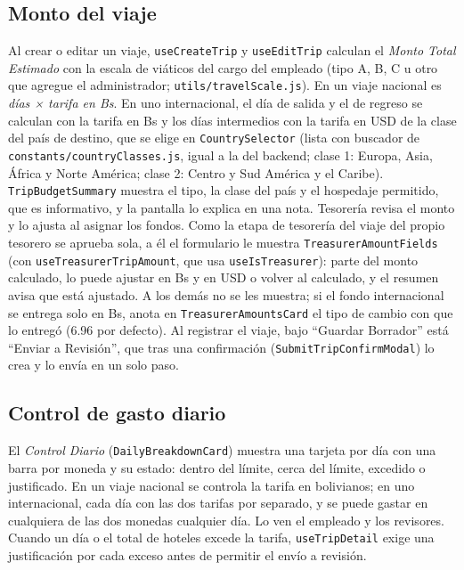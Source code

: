 \documentclass[11pt,letterpaper]{article}
\newcommand{\code}[1]{\nolinkurl{#1}}
\begin{document}
\subsection{Monto del viaje}
Al crear o editar un viaje, \code{useCreateTrip} y \code{useEditTrip} calculan el \emph{Monto Total Estimado} con la escala de viáticos del cargo del empleado (tipo A, B, C u otro que agregue el administrador; \code{utils/travelScale.js}). En un viaje nacional es \emph{días × tarifa en Bs}. En uno internacional, el día de salida y el de regreso se calculan con la tarifa en Bs y los días intermedios con la tarifa en USD de la clase del país de destino, que se elige en \code{CountrySelector} (lista con buscador de \code{constants/countryClasses.js}, igual a la del backend; clase 1: Europa, Asia, África y Norte América; clase 2: Centro y Sud América y el Caribe). \code{TripBudgetSummary} muestra el tipo, la clase del país y el hospedaje permitido, que es informativo, y la pantalla lo explica en una nota. Tesorería revisa el monto y lo ajusta al asignar los fondos. Como la etapa de tesorería del viaje del propio tesorero se aprueba sola, a él el formulario le muestra \code{TreasurerAmountFields} (con \code{useTreasurerTripAmount}, que usa \code{useIsTreasurer}): parte del monto calculado, lo puede ajustar en Bs y en USD o volver al calculado, y el resumen avisa que está ajustado. A los demás no se les muestra; si el fondo internacional se entrega solo en Bs, anota en \code{TreasurerAmountsCard} el tipo de cambio con que lo entregó (6.96 por defecto). Al registrar el viaje, bajo ``Guardar Borrador'' está ``Enviar a Revisión'', que tras una confirmación (\code{SubmitTripConfirmModal}) lo crea y lo envía en un solo paso.

\subsection{Control de gasto diario}
El \emph{Control Diario} (\code{DailyBreakdownCard}) muestra una tarjeta por día con una barra por moneda y su estado: dentro del límite, cerca del límite, excedido o justificado. En un viaje nacional se controla la tarifa en bolivianos; en uno internacional, cada día con las dos tarifas por separado, y se puede gastar en cualquiera de las dos monedas cualquier día. Lo ven el empleado y los revisores. Cuando un día o el total de hoteles excede la tarifa, \code{useTripDetail} exige una justificación por cada exceso antes de permitir el envío a revisión.
\end{document}
